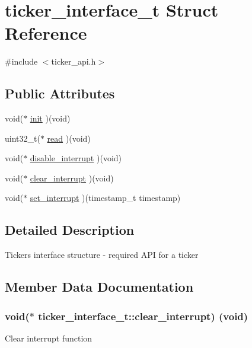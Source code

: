 \hypertarget{structticker__interface__t}{}\section{ticker\+\_\+interface\+\_\+t Struct Reference}
\label{structticker__interface__t}


{\ttfamily \#include $<$ticker\+\_\+api.\+h$>$}

\subsection*{Public Attributes}
\begin{DoxyCompactItemize}
\item 
void($\ast$ \hyperlink{structticker__interface__t_a35d197683ef65e14a8412dcbb5d8e83f}{init} )(void)
\item 
uint32\+\_\+t($\ast$ \hyperlink{structticker__interface__t_a00991371bd7d4036ae69ce70e7025a9e}{read} )(void)
\item 
void($\ast$ \hyperlink{structticker__interface__t_a6876eb9e303388784cd20465095c80fa}{disable\+\_\+interrupt} )(void)
\item 
void($\ast$ \hyperlink{structticker__interface__t_a5d3e49c7006691ef41d24d9291b29aec}{clear\+\_\+interrupt} )(void)
\item 
void($\ast$ \hyperlink{structticker__interface__t_a3e5ddde928d414cb22206097665098fd}{set\+\_\+interrupt} )(timestamp\+\_\+t timestamp)
\end{DoxyCompactItemize}


\subsection{Detailed Description}
Ticker\textquotesingle{}s interface structure -\/ required A\+PI for a ticker 

\subsection{Member Data Documentation}
\subsubsection[{\texorpdfstring{clear\+\_\+interrupt}{clear_interrupt}}]{\setlength{\rightskip}{0pt plus 5cm}void($\ast$ ticker\+\_\+interface\+\_\+t\+::clear\+\_\+interrupt) (void)}\hypertarget{structticker__interface__t_a5d3e49c7006691ef41d24d9291b29aec}{}\label{structticker__interface__t_a5d3e49c7006691ef41d24d9291b29aec}
Clear interrupt function 
